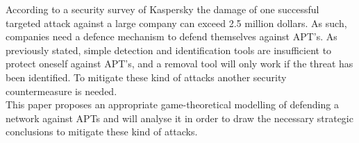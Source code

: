  
According to a security survey of Kaspersky \cite{SurveyKaspersky}  the damage of one successful targeted attack against a large company can exceed 2.5 million dollars. As such, companies need a defence mechanism to defend themselves against APT's. As previously stated, simple detection and identification tools are insufficient to protect oneself against APT's, and a removal tool will only work if the threat has been identified. To mitigate these kind of attacks another security countermeasure is needed. \\
This paper proposes an appropriate game-theoretical modelling of defending a network against APTs and will analyse it in order to draw the necessary strategic conclusions to mitigate these kind of attacks.


